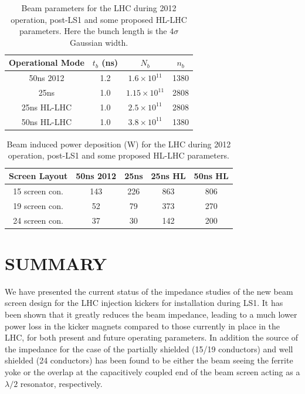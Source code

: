 \documentclass{JAC2003}
\begin{document}
\begin{table}
\caption{Beam parameters for the LHC during 2012 operation, post-LS1 and some proposed HL-LHC parameters. Here the bunch length is the $4\sigma$ Gaussian width.}
\label{tab:BrenHLPara}
\begin{center}
\begin{tabular}{c | c | c | c }
Operational Mode & $t_{b}$ (ns) & $N_{b}$ & $n_{b}$ \\ \hline
50ns 2012 & 1.2 & $1.6 \times 10^{11}$ & 1380 \\ \hline
25ns & 1.0 & $1.15 \times 10^{11}$ & 2808 \\ \hline
25ns HL-LHC & 1.0 &  $2.5 \times 10^{11}$ & 2808 \\ \hline
50ns HL-LHC & 1.0 &  $3.8 \times 10^{11}$ & 1380 \\ 
\end{tabular}
\end{center}
\end{table}

\begin{table}
\caption{Beam induced power deposition (W) for the LHC during 2012 operation, post-LS1 and some proposed HL-LHC parameters.}
\label{tab:PowLoss}
\begin{center}
\begin{tabular}{c | c | c | c | c}
Screen Layout &50ns 2012&25ns&25ns HL&50ns HL\\ \hline
15 screen con. & 143 & 226 & 863 & 806 \\ \hline
19 screen con. & 52 & 79 & 373 & 270 \\ \hline
24 screen con. & 37 & 30 & 142 & 200 \\
\end{tabular}
\end{center}
\end{table}

\section{SUMMARY}

We have presented the current status of the impedance studies of the new beam screen design for the LHC injection kickers for installation during LS1. It has been shown that it greatly reduces the beam impedance, leading to a much lower power loss in the kicker magnets compared to those currently in place in the LHC, for both present and future operating parameters. In addition the source of the impedance for the case of the partially shielded (15/19 conductors) and well shielded (24 conductors) has been found to be either the beam seeing the ferrite yoke or the overlap at the capacitively coupled end of the beam screen acting as a $\lambda /2 $ resonator, respectively. 
\end{document}
